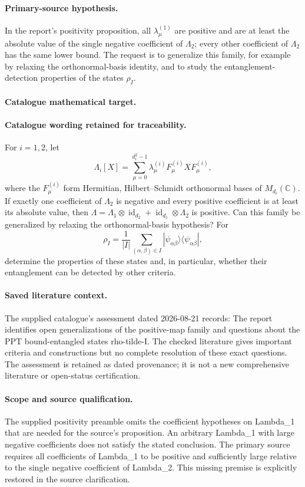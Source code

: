 \documentclass[11pt]{article}
\begin{document}
\paragraph{Primary-source hypothesis.} In the report's positivity proposition, all $\lambda^{(1)}_\mu$ are positive and are at least the absolute value of the single negative coefficient of $\Lambda_2$; every other coefficient of $\Lambda_2$ has the same lower bound. The request is to generalize this family, for example by relaxing the orthonormal-basis identity, and to study the entanglement-detection properties of the states $\rho_I$.

\paragraph{Catalogue mathematical target.}
\paragraph{Catalogue wording retained for traceability.}
For $i=1,2$, let $$\Lambda_i[X]=\sum_{\mu=0}^{d_i^2-1}\lambda_\mu^{(i)}F_\mu^{(i)}XF_\mu^{(i)},$$ where the $F_\mu^{(i)}$ form Hermitian, Hilbert–Schmidt orthonormal bases of $M_{d_i}(\mathbb{C})$. If exactly one coefficient of $\Lambda_2$ is negative and every positive coefficient is at least its absolute value, then $\Lambda=\Lambda_1\otimes\operatorname{id}_{d_2}+\operatorname{id}_{d_1}\otimes\Lambda_2$ is positive. Can this family be generalized by relaxing the orthonormal-basis hypothesis? For $$\rho_I=\frac1{|I|}\sum_{(\alpha,\beta)\in I}|\psi_{\alpha\beta}\rangle\langle\psi_{\alpha\beta}|,$$ determine the properties of these states and, in particular, whether their entanglement can be detected by other criteria.

\paragraph{Saved literature context.} The supplied catalogue's assessment dated 2026-08-21 records: The report identifies open generalizations of the positive-map family and questions about the PPT bound-entangled states rho-tilde-I. The checked literature gives important criteria and constructions but no complete resolution of these exact questions. The assessment is retained as dated provenance; it is not a new comprehensive literature or open-status certification.
\paragraph{Scope and source qualification.}The supplied positivity preamble omits the coefficient hypotheses on Lambda_1 that are needed for the source's proposition. An arbitrary Lambda_1 with large negative coefficients does not satisfy the stated conclusion. The primary source requires all coefficients of Lambda_1 to be positive and sufficiently large relative to the single negative coefficient of Lambda_2. This missing premise is explicitly restored in the source clarification.
\end{document}
